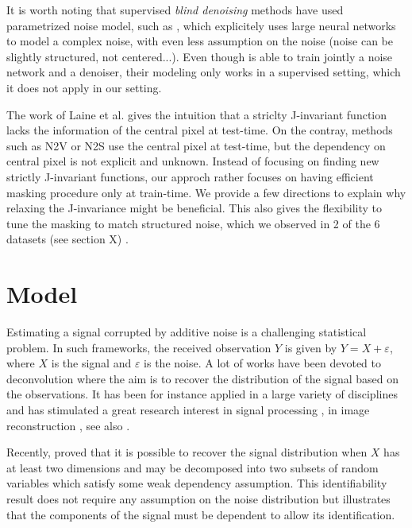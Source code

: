 \documentclass{article}
\begin{document}
It is worth noting that supervised \textit{blind denoising} methods have used parametrized noise model, such as \cite{zhang2017beyond,yue2019variational}, which explicitely uses large neural networks to model a complex noise, with even less assumption on the noise (noise can be slightly structured, not centered...). Even though \cite{yue2019variational} is able to train jointly a noise network and a denoiser, their modeling only works in a supervised setting, which it does not apply in our setting.

The work of Laine et al. \cite{laine2019high} gives the intuition that a striclty J-invariant function lacks the information of the central pixel at test-time.
On the contray, methods such as N2V or N2S use the central pixel at test-time, but the dependency on central pixel is not explicit and unknown.
Instead of focusing on finding new strictly J-invariant functions, our approch rather focuses on having efficient masking procedure only at train-time.
We provide a few directions to explain why relaxing the J-invariance might be beneficial.
This also gives the flexibility to tune the masking to match structured noise, which we observed in 2 of the 6 datasets (see section X) \cite{broaddus2020removing}.

\section{Model}
\label{sec:model}

Estimating a signal corrupted by additive noise  is a challenging statistical problem. In such frameworks, the received observation $Y$ is given by $Y = X + \varepsilon$,  where $X$ is the signal and $\varepsilon$ is the noise. A lot of works have been devoted to deconvolution where the aim is to recover the distribution of the signal based on the observations. It has been for instance applied in a large variety of disciplines and has stimulated a great research interest in signal processing \cite{moulines1997maximum,attias1998blind}, in image reconstruction \cite{kundur1996blind,campisi2017blind}, see also  \cite{meister:2009}.


Recently, \cite{gassiat:lecorff:lehericy:2021} proved that it is possible to recover the signal distribution when $X$ has at least two dimensions and may be decomposed into two subsets of random variables which satisfy some weak dependency assumption. This identifiability result does not require any assumption on the noise distribution but illustrates that the components of the signal must be dependent to allow its identification. %
\end{document}
